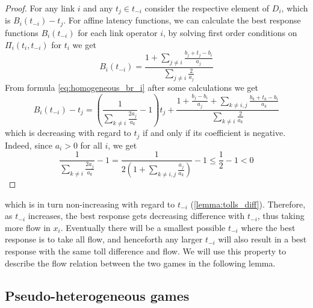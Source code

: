 \documentclass[10pt,a4paper]{book}
\theoremstyle{definition}
\theoremstyle{comment}
\begin{document}
\begin{proof}
	For any link $i$ and any $t_j \in t_{-i}$ consider the respective element of $D_i$, which is $B_i(t_{-i}) - t_j$.
	For affine latency functions, we can calculate the best response functions $B_i(t_{-i})$ for each link operator $i$, by solving first order conditions on $\Pi_i(t_i, t_{-i})$ for $t_i$ we get
	\begin{equation}
		\label{eq:homogeneous_br_i}
		B_i(t_{-i}) = \frac{1 + \sum_{j \ne i}\frac{b_j + t_j - b_i}{a_j}}{\sum_{j \ne i}\frac{2}{a_j}}
	\end{equation}
	From formula \ref{eq:homogeneous_br_i} after some calculations we get
	\[
		B_i(t_{-i}) - t_j = \left(\frac{1}{\sum_{k \ne i} \frac{2a_j}{a_k}} - 1\right)t_j + \frac{1 + \frac{b_j - b_i}{a_j} + \sum_{k \ne i, j}\frac{b_k + t_k - b_i}{a_k}}{\sum_{k \ne i} \frac{2}{a_k}}
	\]
	which is decreasing with regard to $t_j$ if and only if its coefficient is negative.
	Indeed, since $a_i > 0$ for all $i$, we get
	\[
		\frac{1}{\sum_{k \ne i} \frac{2a_j}{a_k}} - 1 = \frac{1}{2 \left(1 + \sum_{k \ne i, j} \frac{a_j}{a_k}\right)} - 1 \leq \frac{1}{2} - 1 < 0
	\]
\end{proof}

which is in turn non-increasing with regard to $t_{-i}$ (\ref{lemma:tolls_diff}).
Therefore, as $t_{-i}$ increases, the best response gets decreasing difference with $t_{-i}$, thus taking more flow in $x_i$.
Eventually there will be a smallest possible $t_{-i}$ where the best response is to take all flow, and henceforth any larger $t_{-i}$ will also result in a best response with the same toll difference and flow.
We will use this property to describe the flow relation between the two games in the following lemma.

\subsection*{Pseudo-heterogeneous games}
\end{document}
